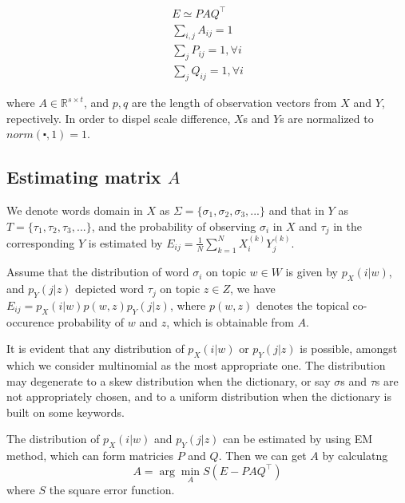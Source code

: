 \documentclass[12pt,a4paper]{article}
\begin{document}
\begin{CJK*}{UTF8}{song}
\begin{eqnarray}
E \simeq P A Q^\top \\
\sum_{i,j} A_{ij} = 1 \\
\sum_{j} P_{ij} = 1, \forall i \\
\sum_{j} Q_{ij} = 1, \forall i
\end{eqnarray}

where $A \in \mathbb{R}^{s \times t}$, and $p, q$ are the length of observation vectors from $X$ and $Y$, repectively. In order to dispel scale difference, $X$s and $Y$s are normalized to $norm(\centerdot, 1) = 1$.

\subsection{Estimating matrix $A$}
We denote words domain in $X$ as $\Sigma = \{\sigma_1, \sigma_2, \sigma_3, ...\}$ and that in $Y$ as $T = \{\tau_1, \tau_2, \tau_3, ... \}$, and the probability of observing $\sigma_i$ in $X$ and $\tau_j$ in the corresponding $Y$ is estimated by $E_{ij} = \frac{1}{N} \sum_{k=1}^{N}{X_i^{(k)} Y_j^{(k)}}$.

Assume that the distribution of word $\sigma_i$ on topic $w \in W$ is given by $p_X(i|w)$, and $p_Y(j|z)$ depicted word $\tau_j$ on topic $z \in Z$, we have $E_{ij} = p_X(i|w) p(w, z) p_Y(j|z)$, where $p(w, z)$ denotes the topical co-occurence probability of $w$ and $z$, which is obtainable from $A$.

It is evident that any distribution of $p_X(i|w)$ or $p_Y(j|z)$ is possible, amongst which we consider multinomial as the most appropriate one. The distribution may degenerate to a skew distribution when the dictionary, or say $\sigma$s and $\tau$s are not appropriately chosen, and to a uniform distribution when the dictionary is built on some keywords.

The distribution of $p_X(i|w)$ and $p_Y(j|z)$ can be estimated by using EM method, which can form matricies $P$ and $Q$. Then we can get $A$ by calculatng
\begin{equation}
A = \arg \min_A S(E - P A Q^\top)
\label{equ_est_A}
\end{equation}
where $S$ the square error function.


\end{CJK*}
\end{document}

